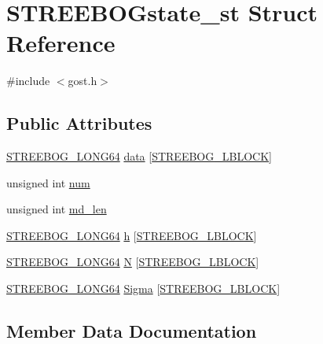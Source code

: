 \hypertarget{struct_s_t_r_e_e_b_o_gstate__st}{}\section{S\+T\+R\+E\+E\+B\+O\+Gstate\+\_\+st Struct Reference}
\label{struct_s_t_r_e_e_b_o_gstate__st}


{\ttfamily \#include $<$gost.\+h$>$}

\subsection*{Public Attributes}
\begin{DoxyCompactItemize}
\item 
\hyperlink{gost_8h_a133f1e2c5857cec83f7364d869ca3a3e}{S\+T\+R\+E\+E\+B\+O\+G\+\_\+\+L\+O\+N\+G64} \hyperlink{struct_s_t_r_e_e_b_o_gstate__st_a132a9f8de8f7962df8e883d2e7e41ac3}{data} \mbox{[}\hyperlink{gost_8h_a6d132eaf939a6b92189d9da912e829b6}{S\+T\+R\+E\+E\+B\+O\+G\+\_\+\+L\+B\+L\+O\+CK}\mbox{]}
\item 
unsigned int \hyperlink{struct_s_t_r_e_e_b_o_gstate__st_a9cbacab82088974fc38f3fe733311586}{num}
\item 
unsigned int \hyperlink{struct_s_t_r_e_e_b_o_gstate__st_a50df6ee825a02dac9b009b2d5118d4a7}{md\+\_\+len}
\item 
\hyperlink{gost_8h_a133f1e2c5857cec83f7364d869ca3a3e}{S\+T\+R\+E\+E\+B\+O\+G\+\_\+\+L\+O\+N\+G64} \hyperlink{struct_s_t_r_e_e_b_o_gstate__st_ad2e9ac787a2e4c7ff173ecb0ff6d5069}{h} \mbox{[}\hyperlink{gost_8h_a6d132eaf939a6b92189d9da912e829b6}{S\+T\+R\+E\+E\+B\+O\+G\+\_\+\+L\+B\+L\+O\+CK}\mbox{]}
\item 
\hyperlink{gost_8h_a133f1e2c5857cec83f7364d869ca3a3e}{S\+T\+R\+E\+E\+B\+O\+G\+\_\+\+L\+O\+N\+G64} \hyperlink{struct_s_t_r_e_e_b_o_gstate__st_a5c369099d5bf733cd1781e4fa13a19c1}{N} \mbox{[}\hyperlink{gost_8h_a6d132eaf939a6b92189d9da912e829b6}{S\+T\+R\+E\+E\+B\+O\+G\+\_\+\+L\+B\+L\+O\+CK}\mbox{]}
\item 
\hyperlink{gost_8h_a133f1e2c5857cec83f7364d869ca3a3e}{S\+T\+R\+E\+E\+B\+O\+G\+\_\+\+L\+O\+N\+G64} \hyperlink{struct_s_t_r_e_e_b_o_gstate__st_a077a86f03ca4910d5f7940d51b802749}{Sigma} \mbox{[}\hyperlink{gost_8h_a6d132eaf939a6b92189d9da912e829b6}{S\+T\+R\+E\+E\+B\+O\+G\+\_\+\+L\+B\+L\+O\+CK}\mbox{]}
\end{DoxyCompactItemize}


\subsection{Member Data Documentation}
